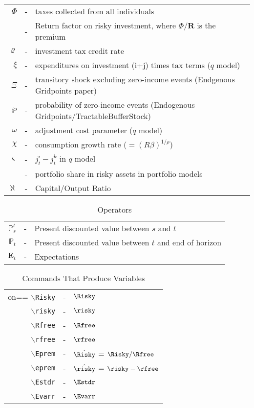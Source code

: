 \documentclass{article}
\begin{document}
\begin{table}
\begin{tabular}{rcl}
\\  $\Phi$    & - & taxes collected from all individuals
\\            & - & Return factor on risky investment, where $\Phi/\mathbf{R}$ is the premium
\\  $\varrho$    & - & investment tax credit rate
\\  $\xi$     & - & expenditures on investment (i+j) times tax terms ($q$ model)
\\  $\Xi$     & - & transitory shock excluding zero-income events (Endgenous Gridpoints paper)
\\  $\wp$     & - & probability of zero-income events (Endogenous Gridpoints/TractableBufferStock)
\\  $\omega$  & - & adjustment cost parameter ($q$ model)
\\  $\chi$    & - & consumption growth rate ($=(R \beta)^{1/\rho}$)
\\  $\varsigma$ & - & $j_{t}^{i}-j_{t}^{k}$ in $q$ model
\\   & - & portfolio share in risky assets in portfolio models
\\  $\aleph$  & - & Capital/Output Ratio
\end{tabular}
\end{table}

\begin{table}
\caption{Operators}
\begin{tabular}{rcl}
    $\mathbb{P}_{s}^{t}$ & - & Present discounted value between $s$ and $t$
\\  $\mathbb{P}_{t}$     & - & Present discounted value between $t$ and end of horizon
\\ $\mathbf{E}_{t}$ & - & Expectations
\end{tabular}
\end{table}


\begin{table}
\caption{Commands That Produce Variables}
\begin{tabular}{rcl}on==
   \texttt{$\backslash$Risky} & - & $\Risky$ 
\\ \texttt{$\backslash$risky} & - & $\risky$
\\ \texttt{$\backslash$Rfree} & - & $\Rfree$
\\ \texttt{$\backslash$rfree} & - & $\rfree$
\\ \texttt{$\backslash$Eprem} & - & $\hat{\Risky}$ = $\Risky/\Rfree$
\\ \texttt{$\backslash$eprem} & - & $\hat{\risky}$ = $\risky - \rfree$
\\ \texttt{$\backslash$Estdr} & - & $\Estdr$
\\ \texttt{$\backslash$Evarr} & - & $\Evarr$
\end{tabular}
\end{table}

% 
%
\end{document}
